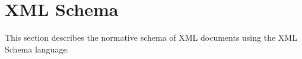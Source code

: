 
\section{XML Schema}%
\label{app:xml}

This section describes the normative schema of XML documents using the XML Schema language.

